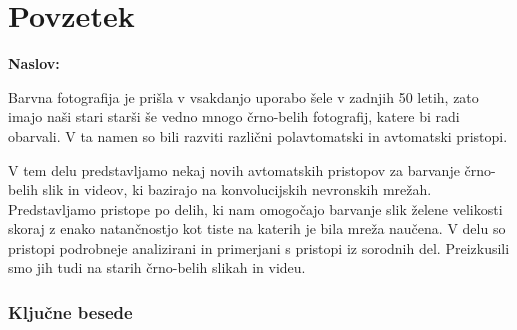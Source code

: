 \chapter*{Povzetek}

\noindent\textbf{Naslov:} \ttitle
\bigskip

Barvna fotografija je prišla v vsakdanjo uporabo šele v zadnjih 50 letih, zato imajo naši stari starši še vedno mnogo črno-belih fotografij, katere bi radi obarvali. V ta namen so bili razviti različni polavtomatski in avtomatski pristopi. 

V tem delu predstavljamo nekaj novih avtomatskih pristopov za barvanje črno-belih slik in videov, ki bazirajo na konvolucijskih nevronskih mrežah. Predstavljamo pristope po delih, ki nam omogočajo barvanje slik želene velikosti skoraj z enako natančnostjo kot tiste na katerih je bila mreža naučena. V delu so pristopi podrobneje analizirani in primerjani s pristopi iz sorodnih del. Preizkusili smo jih tudi na starih črno-belih slikah in videu. 

\subsection*{Ključne besede}
\textit{\tkeywords}
\clearemptydoublepage